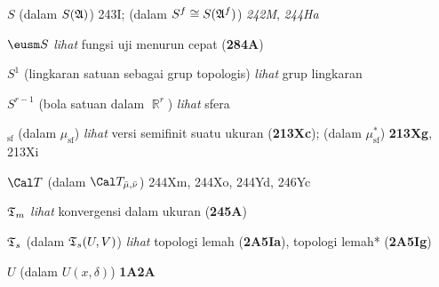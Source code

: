 \indexmedskip
{}

$S$ (dalam $S(\frak A)$) 243I; 
  (dalam $S^f\cong S(\frak A^f)$) {\it 242M}, {\it 244Ha}




$\eusm S$ {\it lihat} fungsi uji menurun cepat ({\bf 284A})




$S^1$ (lingkaran satuan sebagai grup topologis) {\it lihat} grup lingkaran


$S^{r-1}$ (bola satuan dalam $\BbbR^r$) {\it lihat} sfera









$_{\text{sf}}$ (dalam $\mu_{\text{sf}}$)
{\it lihat} versi semifinit suatu ukuran ({\bf 213Xc});
  (dalam $\mu^*_{\text{sf}}$) {\bf 213Xg}, 213Xi


















\indexmedskip
{}









$\Cal T$ (dalam $\Cal T_{\bar\mu,\bar\nu}$) 244Xm, 244Xo, 244Yd,
246Yc












$\frak T_m$ {\it lihat} konvergensi dalam ukuran ({\bf 245A})






$\frak T_s$ (dalam $\frak T_s(U,V)$)  
  {\it lihat} topologi lemah ({\bf 2A5Ia}),
  topologi lemah* ({\bf 2A5Ig})




\indexmedskip
{}

$U$ (dalam $U(x,\delta)$) {\bf 1A2A}













